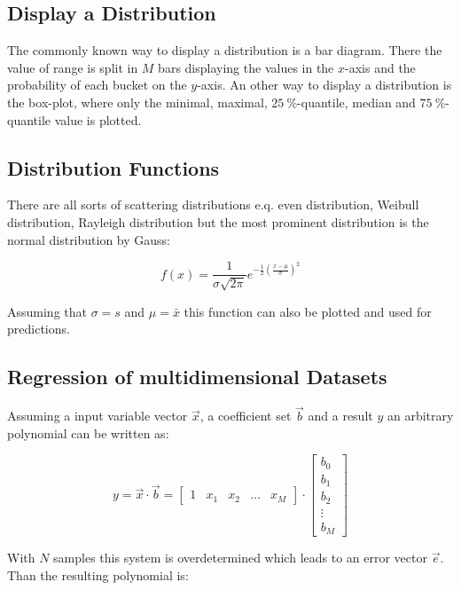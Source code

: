 \subsection{Display a Distribution}

The commonly known way to display a distribution is a bar diagram. There the value of range is split in $M$ bars displaying the values in the $x$-axis and the probability of each bucket on the $y$-axis. An other way to display a distribution is the box-plot, where only the minimal, maximal, $\SI{25}{\percent}$-quantile, median and $\SI{75}{\percent}$-quantile value is plotted.

\subsection{Distribution Functions}
There are all sorts of scattering distributions e.q. even distribution, Weibull distribution, Rayleigh distribution but the most prominent distribution is the normal distribution by Gauss:

\begin{equation}
f\left( x \right) = \frac{1}{\sigma\sqrt{2\pi}}e^{-\frac{1}{2}\left(\frac{x-\mu}{\sigma}\right)^2}
\end{equation}

Assuming that $\sigma = s$ and $\mu = \bar{x}$ this function can also be plotted and used for predictions.

 \subsection{Regression of multidimensional Datasets}
 
Assuming a input variable vector $\vec{x}$, a coefficient set $\vec{b}$ and a result $y$ an arbitrary polynomial can be written as: \cite{sip}

\begin{equation}
y = \vec{x}\cdot\vec{b}=\begin{bmatrix}
1 & x_1 & x_2 & \dots & x_M
\end{bmatrix} \cdot \begin{bmatrix}
b_0 \\ b_1 \\ b_2 \\ \vdots \\ b_M
\end{bmatrix}
\end{equation}

With $N$ samples this system is overdetermined which leads to an error vector $\vec{e}$. Than the resulting polynomial is:

